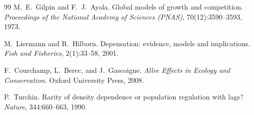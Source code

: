 \documentclass[11pt]{article}
\begin{document}
\begin{thebibliography}{99}
M.~E.~Gilpin and F.~J.~Ayala.
\newblock Global models of growth and competition.
\newblock \emph{Proceedings of the National Academy of Sciences (PNAS)}, 70(12):3590--3593, 1973.

M.~Liermann and R.~Hilborn.
\newblock Depensation: evidence, models and implications.
\newblock \emph{Fish and Fisheries}, 2(1):33--58, 2001.

F.~Courchamp, L.~Berec, and J.~Gascoigne.
\newblock \emph{Allee Effects in Ecology and Conservation}.
\newblock Oxford University Press, 2008.

P.~Turchin.
\newblock Rarity of density dependence or population regulation with lags?
\newblock \emph{Nature}, 344:660--663, 1990.

\end{thebibliography}
\end{document}
